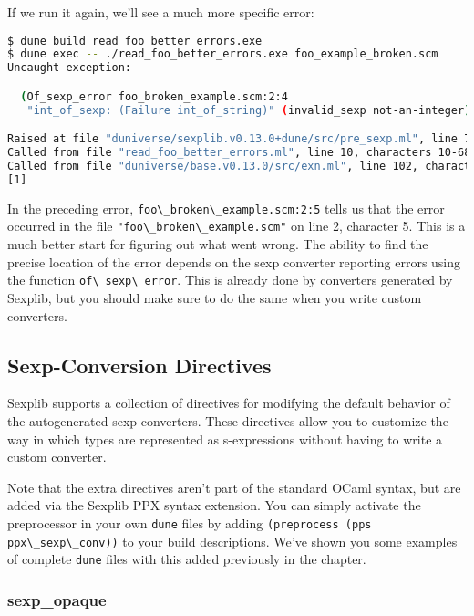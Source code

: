 If we run it again, we'll see a much more specific error:

\begin{lstlisting}[language=bash]
$ dune build read_foo_better_errors.exe
$ dune exec -- ./read_foo_better_errors.exe foo_example_broken.scm
Uncaught exception:

  (Of_sexp_error foo_broken_example.scm:2:4
   "int_of_sexp: (Failure int_of_string)" (invalid_sexp not-an-integer))

Raised at file "duniverse/sexplib.v0.13.0+dune/src/pre_sexp.ml", line 742, characters 4-56
Called from file "read_foo_better_errors.ml", line 10, characters 10-68
Called from file "duniverse/base.v0.13.0/src/exn.ml", line 102, characters 6-10
[1]
\end{lstlisting}

In the preceding error,
\passthrough{\lstinline!foo\_broken\_example.scm:2:5!} tells us that the
error occurred in the file
\passthrough{\lstinline!"foo\_broken\_example.scm"!} on line 2,
character 5. This is a much better start for figuring out what went
wrong. The ability to find the precise location of the error depends on
the sexp converter reporting errors using the function
\passthrough{\lstinline!of\_sexp\_error!}. This is already done by
converters generated by Sexplib, but you should make sure to do the same
when you write custom converters.

\hypertarget{sexp-conversion-directives}{%
\subsection{Sexp-Conversion
Directives}\label{sexp-conversion-directives}}

Sexplib supports a collection of directives for modifying the default
behavior of the autogenerated sexp converters. These directives allow
you to customize the way in which types are represented as s-expressions
without having to write a custom converter.

Note that the extra directives aren't part of the standard OCaml syntax,
but are added via the Sexplib PPX syntax extension. You can simply
activate the preprocessor in your own \passthrough{\lstinline!dune!}
files by adding
\passthrough{\lstinline!(preprocess (pps ppx\_sexp\_conv))!} to your
build descriptions. We've shown you some examples of complete
\passthrough{\lstinline!dune!} files with this added previously in the
chapter.

\hypertarget{sexp_opaque}{%
\subsubsection{sexp\_opaque}\label{sexp_opaque}}

